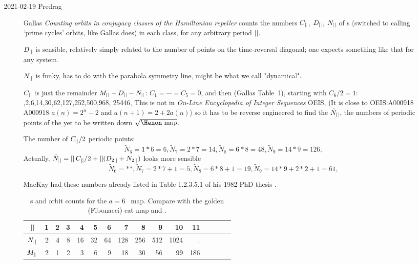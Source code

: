 \begin{description}
\item[2021-02-19 Predrag]
Gallas {\em Counting orbits in conjugacy classes of
the {{\Henon} Hamiltonian} repeller} counts the numbers $C_{||}$,
$D_{||}$, $N_{||}$ of  {\orbit}s
(switched to calling `prime cycles' orbits, like Gallas does) in each class, for any
arbitrary period ${||}$.

$D_{||}$ is sensible, relatively simply related to the number of points on the
time-reversal diagonal; one expects something like that for any system.

 $N_{||}$ is funky,  has to do with the parabola symmetry
line, might be what we call "dynamical".

$C_{||}$ is just the remainder $M_{||}-D_{||}-N_{||}$:
$C_1=\cdots=C_5=0$, and then (Gallas Table~1), starting with $C_6/2=1$:
,2,6,14,30,62,127,252,500,968, 25446,\cdots
{}
This is not in \emph{On-Line Encyclopedia of Integer Sequences}
 {OEIS},
(It is close to  {OEIS:A000918} A000918 		
$a(n) = 2^n - 2$ and $a(n+1) = 2 + 2a(n)$)
so it has to be reverse engineered to find the $\tilde{N}_{||}$, the numbers of
periodic points of the yet to be written down $\sqrt{\mbox{\Henon\ map}}$.


The number of $C_{||}/2$ periodic points:
\[
  \tilde{N}_6= 1*6=6,
  \tilde{N}_7= 2*7=14,
  \tilde{N}_8= 6*8=48,
  \tilde{N}_9= 14*9=126,
\]
Actually, $ \tilde{N}_{||}= {||}\,C_{||}/2+{||}(D_{2{||}}+N_{2{||}})$
looks more sensible
\[
  \tilde{N}_6= **,
  \tilde{N}_7= 2*7+1=5,
  \tilde{N}_8= 6*8+1=19,
  \tilde{N}_9= 14*9+2*2+1=61,
\]


MacKay had these numbers already
listed in Table 1.2.3.5.1 of his 1982 PhD thesis
.

\begin{table}
\begin{tabular}{c|rrrrr|rrrrr|rrrrr}
${||}$ &  1 &  2 &  3 &  4 &  5 &
       6 &  7 &  8 &  9 & 10 &
      11 \\%
\hline
$N_{||}$ &  2 &  4 &  8 & 16 &  32 &
       64 &  128 &  256 & 512 & 1024 &
      . %
             \rule[-1ex]{0ex}{3.5ex} \\
$M_{||}$ &   2 &   1 &   2 &  3 &  6 &
         9 & 18 &  30 & 56  & 99 &
       186 &  %
\end{tabular}
\bigskip
\caption{\label{tab:HamHenon}
{\Lattstate}s and %
orbit counts for the ${a}=6$ \Henon\ map.
Compare with the golden (Fibonacci) cat map 
and .
}
\end{table}
%


\end{description}
